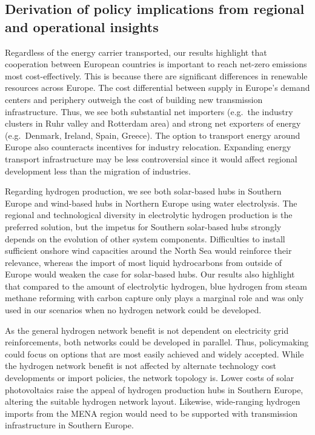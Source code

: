\subsection*{Derivation of policy implications from regional and operational insights}
\label{sec:policy}

Regardless of the energy carrier transported, our results highlight that
cooperation between European countries is important to reach net-zero \co
emissions most cost-effectively. This is because there are significant
differences in renewable resources across Europe. The cost differential between
supply in Europe's demand centers and periphery outweigh the cost of building
new transmission infrastructure. Thus, we see both substantial net importers
(e.g.~the industry clusters in Ruhr valley and Rotterdam area) and strong net
exporters of energy (e.g.~Denmark, Ireland, Spain, Greece). The option to
transport energy around Europe also counteracts incentives for industry
relocation. Expanding energy transport infrastructure may be less controversial
since it would affect regional development less than the migration of
industries.

Regarding hydrogen production, we see both solar-based hubs in Southern Europe
and wind-based hubs in Northern Europe using water electrolysis. The regional
and technological diversity in electrolytic hydrogen production is the preferred
solution, but the impetus for Southern solar-based hubs strongly depends on the
evolution of other system components. Difficulties to install sufficient onshore
wind capacities around the North Sea would reinforce their relevance, whereas
the import of most liquid hydrocarbons from outside of Europe would weaken the
case for solar-based hubs. Our results also highlight that compared to the
amount of electrolytic hydrogen, blue hydrogen from steam methane reforming with
carbon capture only plays a marginal role and was only used in our scenarios
when no hydrogen network could be developed.

As the general hydrogen network benefit is not dependent on electricity grid
reinforcements, both networks could be developed in parallel. Thus, policymaking
could focus on options that are most easily achieved and widely accepted. While
the hydrogen network benefit is not affected by alternate technology cost
developments or import policies, the network topology is. Lower costs of solar
photovoltaics raise the appeal of hydrogen production hubs in Southern Europe,
altering the suitable hydrogen network layout. Likewise, wide-ranging hydrogen
imports from the MENA region would need to be supported with transmission
infrastructure in Southern Europe.

